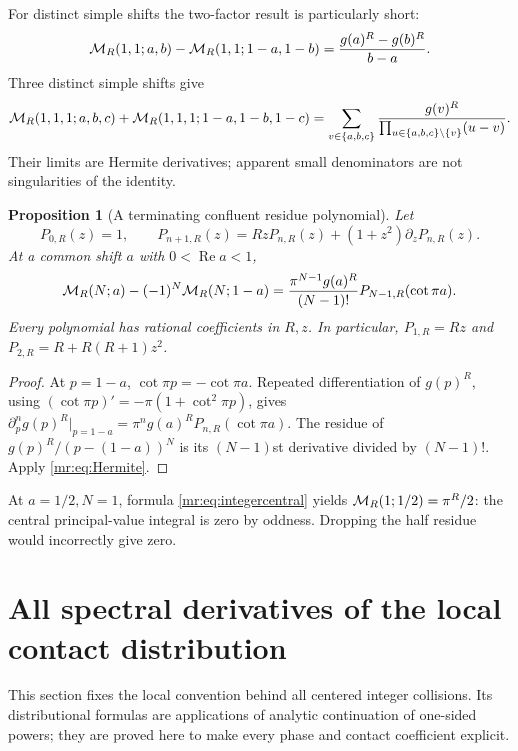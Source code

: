 \documentclass[11pt,letterpaper]{article}
\newtheorem{proposition}[theorem]{Proposition}
\theoremstyle{definition}\newtheorem{definition}[theorem]{Definition}
\theoremstyle{remark}\newtheorem{remark}[theorem]{Remark}
\newcommand{\Rea}{\operatorname{Re}}\newcommand{\Ima}{\operatorname{Im}}
\begin{document}
For distinct simple shifts the two-factor result is particularly short:
\begin{equation}\label{mr:eq:tworeflect}
 \mathcal M_R(1,1;a,b)-\mathcal M_R(1,1;1-a,1-b)
 =\frac{g(a)^R-g(b)^R}{b-a}.
\end{equation}
Three distinct simple shifts give
\begin{equation}\label{mr:eq:threereflect}
 \mathcal M_R(1,1,1;a,b,c)+\mathcal M_R(1,1,1;1-a,1-b,1-c)
 =\sum_{v\in\{a,b,c\}}
   \frac{g(v)^R}{\prod_{u\in\{a,b,c\}\setminus\{v\}}(u-v)}.
\end{equation}
Their limits are Hermite derivatives; apparent small denominators are
not singularities of the identity.

\begin{proposition}[A terminating confluent residue polynomial]\label{mr:prop:Pn}
Let
\begin{equation}\label{mr:eq:Pn}
 P_{0,R}(z)=1,\qquad
 P_{n+1,R}(z)=RzP_{n,R}(z)+(1+z^2)\partial_zP_{n,R}(z).
\end{equation}
At a common shift $a$ with $0<\Rea a<1$,
\begin{equation}\label{mr:eq:commoninteger}
 \mathcal M_R(N;a)-(-1)^N\mathcal M_R(N;1-a)
 =\frac{\pi^{N-1}g(a)^R}{(N-1)!}P_{N-1,R}(\cot\pi a).
\end{equation}
Every polynomial has rational coefficients in $R,z$. In particular,
$P_{1,R}=Rz$ and $P_{2,R}=R+R(R+1)z^2$.
\end{proposition}
\begin{proof}
At $p=1-a$, $\cot\pi p=-\cot\pi a$. Repeated differentiation of
$g(p)^R$, using $(\cot\pi p)'=-\pi(1+\cot^2\pi p)$, gives
$\partial_p^n g(p)^R|_{p=1-a}=\pi^ng(a)^RP_{n,R}(\cot\pi a)$.
The residue of $g(p)^R/(p-(1-a))^N$ is its $(N-1)$st derivative
divided by $(N-1)!$. Apply \eqref{mr:eq:Hermite}.
\end{proof}
At $a=1/2,N=1$, formula \eqref{mr:eq:integercentral} yields
$\mathcal M_R(1;1/2)=\pi^R/2$: the central principal-value integral is zero
by oddness. Dropping the half residue would incorrectly give zero.

\section{All spectral derivatives of the local contact distribution}
\label{mr:sec:contact}
This section fixes the local convention behind all centered integer
collisions. Its distributional formulas are applications of analytic
continuation of one-sided powers; they are proved here to make every
phase and contact coefficient explicit.
\end{document}

